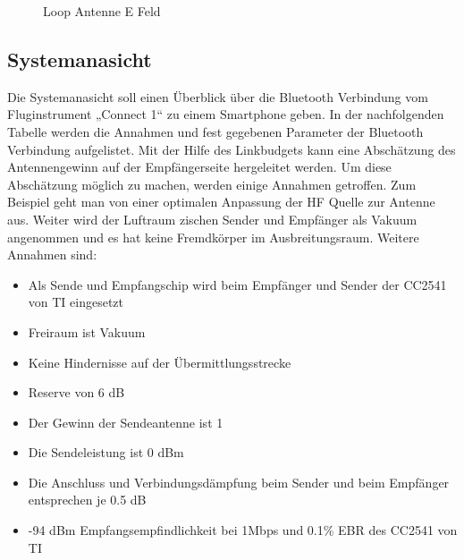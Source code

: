 \begin{figure}
\begin{center}
\end{center}
\caption{Loop Antenne E Feld}
\label{DipolEFerd}
\end{figure}
\subsection{Systemanasicht}
Die Systemanasicht soll einen Überblick über die Bluetooth Verbindung vom Fluginstrument „Connect 1“ zu einem Smartphone geben.
In der nachfolgenden Tabelle werden die Annahmen und fest gegebenen Parameter der Bluetooth Verbindung aufgelistet. Mit der Hilfe des Linkbudgets kann eine Abschätzung des Antennengewinn auf der Empfängerseite hergeleitet werden. Um diese Abschätzung möglich zu machen, werden einige Annahmen getroffen. Zum Beispiel geht man von einer optimalen Anpassung der HF Quelle zur Antenne aus. Weiter wird der Luftraum zischen Sender und Empfänger als Vakuum angenommen und es hat keine Fremdkörper im Ausbreitungsraum.
Weitere Annahmen sind:
\begin{itemize}
\item Als Sende und Empfangschip wird beim Empfänger und Sender der CC2541 von TI eingesetzt
\item 	Freiraum ist Vakuum
\item Keine Hindernisse auf der Übermittlungsstrecke
\item Reserve von 6 dB

\item Der Gewinn der Sendeantenne ist 1
\item Die Sendeleistung ist 0 dBm
\item Die Anschluss und Verbindungsdämpfung beim Sender und beim Empfänger entsprechen je 0.5 dB
\item -94 dBm Empfangsempfindlichkeit bei 1Mbps und 0.1\% EBR des CC2541 von TI
\end{itemize}
